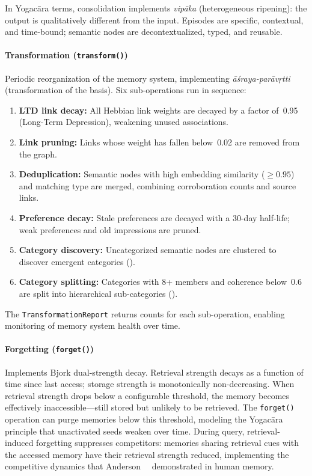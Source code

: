 In Yogac\=ara terms, consolidation implements \emph{vip\=aka}
(heterogeneous ripening): the output is qualitatively different from the
input. Episodes are specific, contextual, and time-bound; semantic nodes
are decontextualized, typed, and reusable.

\paragraph{Transformation (\texttt{transform()})}
Periodic reorganization of the memory system, implementing
\emph{\=a\'sraya-par\=av\d{r}tti} (transformation of the basis). Six
sub-operations run in sequence:
\begin{enumerate}[nosep]
    \item \textbf{LTD link decay:} All Hebbian link weights are decayed by
    a factor of~0.95 (Long-Term Depression), weakening unused associations.
    \item \textbf{Link pruning:} Links whose weight has fallen below~0.02
    are removed from the graph.
    \item \textbf{Deduplication:} Semantic nodes with high embedding
    similarity ($\geq 0.95$) and matching type are merged, combining
    corroboration counts and source links.
    \item \textbf{Preference decay:} Stale preferences are decayed with a
    30-day half-life; weak preferences and old impressions are pruned.
    \item \textbf{Category discovery:} Uncategorized semantic nodes are
    clustered to discover emergent categories ().
    \item \textbf{Category splitting:} Categories with 8+ members and
    coherence below~0.6 are split into hierarchical sub-categories
    ().
\end{enumerate}
The \texttt{TransformationReport} returns counts for each sub-operation,
enabling monitoring of memory system health over time.

\paragraph{Forgetting (\texttt{forget()})}
Implements Bjork dual-strength decay. Retrieval strength decays as a
function of time since last access; storage strength is monotonically
non-decreasing. When retrieval strength drops below a configurable
threshold, the memory becomes effectively inaccessible---still stored but
unlikely to be retrieved. The \texttt{forget()} operation can purge
memories below this threshold, modeling the Yogac\=ara principle that
unactivated seeds weaken over time. During query, retrieval-induced
forgetting suppresses competitors: memories sharing retrieval cues with
the accessed memory have their retrieval strength reduced, implementing
the competitive dynamics that Anderson~\etal~\cite{anderson1994}
demonstrated in human memory.

